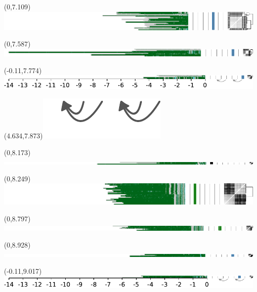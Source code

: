 \documentclass{article}
\begin{document}
\begin{textblock}{13}(0,7.109)\includegraphics{./Figure_S4/4ptel_1-500K_1_12_12-HG005.pdf}\end{textblock}
\begin{textblock}{13}(0,7.587)\includegraphics{./Figure_S4/4ptel_1-500K_1_12_12-HG006.pdf}\end{textblock}
\begin{textblock}{13}(-0.11,7.774)\includegraphics{./Figure_S4/4ptel_1-500K_1_12_12-HG007.pdf}\end{textblock}
\begin{textblock}{13}(4.634,7.873)\includegraphics[width=.78in,keepaspectratio]{Figure_4/fatter-arrows.pdf}\end{textblock}
\begin{textblock}{13}(0,8.173)\includegraphics{./Figure_S4/chr5-HG001.pdf}\end{textblock}
\begin{textblock}{13}(0,8.249)\includegraphics{./Figure_S4/chr5-HG002.pdf}\end{textblock}
\begin{textblock}{13}(0,8.797)\includegraphics{./Figure_S4/chr5-HG003.pdf}\end{textblock}
\begin{textblock}{13}(0,8.928)\includegraphics{./Figure_S4/chr5-HG005.pdf}\end{textblock}
\begin{textblock}{13}(-0.11,9.017)\includegraphics{./Figure_S4/chr5-HG006.pdf}\end{textblock}
\end{document}
